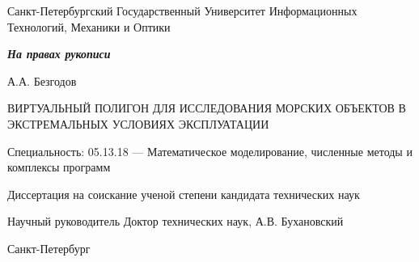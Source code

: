 \begin{titlepage}
\begin{center}

Санкт-Петербургский Государственный Университет Информационных Технологий, Механики и Оптики

\begin{flushright}
\textit{\textbf{На правах рукописи}}
\end{flushright}

\vspace*{0.5in}

\vspace{1.0in}
{\large А.А. Безгодов}
\vspace{0.25in}

{\large ВИРТУАЛЬНЫЙ ПОЛИГОН ДЛЯ ИССЛЕДОВАНИЯ МОРСКИХ ОБЪЕКТОВ В ЭКСТРЕМАЛЬНЫХ УСЛОВИЯХ ЭКСПЛУАТАЦИИ}
\vspace{0.5in}

Специальность: 05.13.18 --- Математическое моделирование, численные методы и комплексы программ
\vspace{0.25in}

Диссертация на соискание ученой степени  \linebreak
кандидата технических наук
\vspace{0.5in}

\begin{flushright}
Научный руководитель \linebreak
Доктор технических наук, \linebreak
А.В. Бухановский \linebreak
\end{flushright}

\vspace{1.0in}
Санкт-Петербург  



\end{center}
\end{titlepage}
